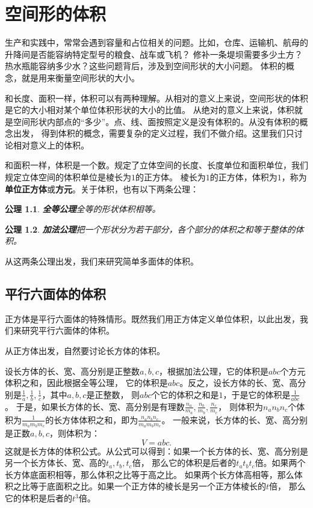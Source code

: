 \documentclass[12pt,UTF8]{ctexbook}
\newtheorem{po}{公理}
\begin{document}
\chapter{空间形的体积}

生产和实践中，常常会遇到容量和占位相关的问题。比如，仓库、运输机、航母的升降间是否能容纳特定型号的粮食、战车或飞机？
修补一条堤坝需要多少土方？热水瓶能容纳多少水？这些问题背后，涉及到空间形状的大小问题。
体积的概念，就是用来衡量空间形状的大小。

和长度、面积一样，体积可以有两种理解。从相对的意义上来说，空间形状的体积是它的大小相对某个单位体积形状的大小的比值。
从绝对的意义上来说，体积就是空间形状内部点的“多少”。点、线、面按照定义是没有体积的。从没有体积的概念出发，
得到体积的概念，需要复杂的定义过程，我们不做介绍。这里我们只讨论相对意义上的体积。

和面积一样，体积是一个数。规定了立体空间的长度、长度单位和面积单位，我们规定立体空间的体积单位是棱长为$1$的正方体。
棱长为$1$的正方体，体积为$1$，称为\textbf{单位正方体}或\textbf{方元}。关于体积，也有以下两条公理：
\begin{po}{\textbf{全等公理}}\label{po:4}
    全等的形状体积相等。
\end{po}
\begin{po}{\textbf{加法公理}}\label{po:5}
    把一个形状分为若干部分，各个部分的体积之和等于整体的体积。
\end{po}
从这两条公理出发，我们来研究简单多面体的体积。

\section{平行六面体的体积}

正方体是平行六面体的特殊情形。既然我们用正方体定义单位体积，以此出发，我们来研究平行六面体的体积。

从正方体出发，自然要讨论长方体的体积。

设长方体的长、宽、高分别是正整数$a,b,c$，根据加法公理，它的体积是$abc$个方元体积之和，因此根据全等公理，
它的体积是$abc$。反之，设长方体的长、宽、高分别是$\frac{1}{a},\frac{1}{b},\frac{1}{c}$，其中$a,b,c$是正整数，
则$abc$个它的体积之和是$1$，于是它的体积是$\frac{1}{abc}$。
于是，如果长方体的长、宽、高分别是有理数$\frac{n_a}{m_a},\frac{n_b}{m_b},\frac{n_c}{m_c}$，
则体积为$n_an_bn_c$个体积为$\frac{1}{m_am_bm_c}$的长方体体积之和，即为$\frac{n_an_bn_c}{m_am_bm_c}$。
一般来说，长方体的长、宽、高分别是正数$a,b,c$，则体积为：
$$ V = abc.$$
这就是长方体的体积公式。从公式可以得到：如果一个长方体的长、宽、高分别是另一个长方体长、宽、高的$t_a,t_b,t_c$倍，
那么它的体积是后者的$t_at_bt_c$倍。如果两个长方体底面积相等，那么体积之比等于高之比。
如果两个长方体高相等，那么体积之比等于底面积之比。如果一个正方体的棱长是另一个正方体棱长的$t$倍，
那么它的体积是后者的$t^3$倍。
\end{document}
